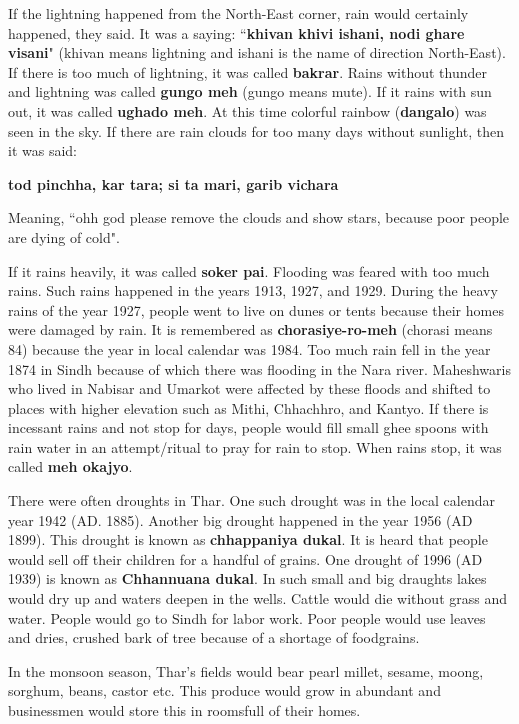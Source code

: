 If the lightning happened from the North-East corner, rain would certainly
happened, they said. It was a saying: ``\textbf{khivan khivi ishani, nodi ghare
visani}" (khivan means lightning and ishani is the name of direction
North-East). If there is too much of lightning, it was called \textbf{bakrar}.
Rains without thunder and lightning was called \textbf{gungo meh} (gungo means
mute). If it rains with sun out, it was called \textbf{ughado meh}. At this
time colorful rainbow (\textbf{dangalo}) was seen in the sky. If there are rain
clouds for too many days without sunlight, then it was said:

\textbf{tod pinchha, kar tara; si ta mari, garib vichara}

Meaning, ``ohh god please remove the clouds and show stars, because poor people
are dying of cold".

If it rains heavily, it was called \textbf{soker pai}. Flooding was feared with
too much rains. Such rains happened in the years 1913, 1927, and 1929. During
the heavy rains of the year 1927, people went to live on dunes or tents because
their homes were damaged by rain. It is remembered as \textbf{chorasiye-ro-meh}
(chorasi means 84) because the year in local calendar was 1984. Too much rain
fell in the year 1874 in Sindh because of which there was flooding in the Nara
river. Maheshwaris who lived in Nabisar and Umarkot were affected by these
floods and shifted to places with higher elevation such as Mithi, Chhachhro,
and Kantyo. If there is incessant rains and not stop for days, people would
fill small ghee spoons with rain water in an attempt/ritual to pray for rain to
stop. When rains stop, it was called \textbf{meh okajyo}. 

There were often droughts in Thar. One such drought was in the local calendar
year 1942 (AD. 1885). Another big drought happened in the year 1956 (AD 1899).
This drought is known as \textbf{chhappaniya dukal}. It is heard that people
would sell off their children for a handful of grains. One drought of 1996 (AD
1939) is known as \textbf{Chhannuana dukal}. In such small and big draughts
lakes would dry up and waters deepen in the wells. Cattle would die without
grass and water. People would go to Sindh for labor work. Poor people would use
leaves and dries, crushed bark of tree because of a shortage of foodgrains. 

In the monsoon season, Thar's fields would bear pearl millet, sesame, moong,
sorghum, beans, castor etc. This produce would grow in abundant and businessmen
would store this in roomsfull of their homes. 

